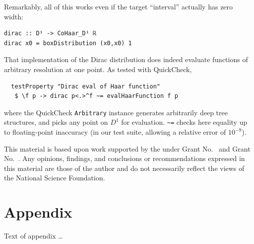 \documentclass[sigplan,review,anonymous]{acmart}\settopmatter{printfolios=true,printccs=false,printacmref=false}
\begin{document}
Remarkably, all of this works even if the target “interval” actually has zero width:
\begin{lstlisting}
dirac :: D¹ -> CoHaar_D¹ ℝ
dirac x0 = boxDistribution (x0,x0) 1
\end{lstlisting}
That implementation of the Dirac distribution does indeed evaluate functions of arbitrary resolution at one point. As tested with QuickCheck,
\begin{lstlisting}
  testProperty "Dirac eval of Haar function"
   $ \f p -> dirac p<.>^f ~= evalHaarFunction f p
\end{lstlisting}
where the QuickCheck \lstinline`Arbitrary` instance generates arbitrarily deep tree structures, and picks any point on $D^1$ for evaluation. \lstinline`~=` checks here equality up to floating-point inaccuracy (in our test suite, allowing a relative error of $10^{-9}$).

\begin{acks}                            %
  This material is based upon work supported by the
   under Grant
  No.~ and Grant
  No.~.  Any opinions, findings, and
  conclusions or recommendations expressed in this material are those
  of the author and do not necessarily reflect the views of the
  National Science Foundation.
\end{acks}


%


\appendix
\section{Appendix}

Text of appendix \ldots
\end{document}
